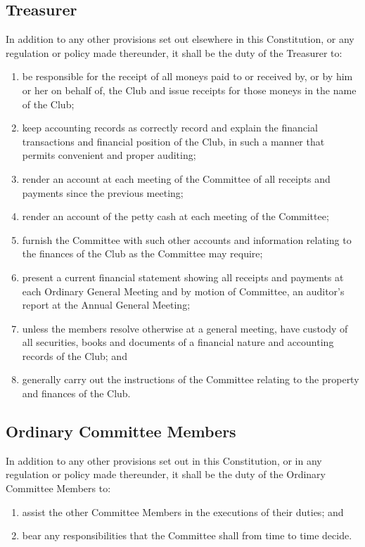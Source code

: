 \documentclass[11pt]{article} %
\begin{document}
\subsection{Treasurer}
In addition to any other provisions set out elsewhere in this Constitution, or any regulation or policy made thereunder, it shall be the duty of the Treasurer to:
\begin{enumerate}
	\item be responsible for the receipt of all moneys paid to or received by, or by him or her on behalf of, the Club and issue receipts for those moneys in the name of the Club;
	\item keep accounting records as correctly record and explain the financial transactions and financial position of the Club, in such a manner that permits convenient and proper auditing;
	\item render an account at each meeting of the Committee of all receipts and payments since the previous meeting;
	\item render an account of the petty cash at each meeting of the Committee;
	\item furnish the Committee with such other accounts and information relating to the finances of the Club as the Committee may require;
	\item present a current financial statement showing all receipts and payments at each Ordinary General Meeting and by motion of Committee, an auditor's report at the Annual General Meeting;
	\item unless the members resolve otherwise at a general meeting, have custody of all securities, books and documents of a financial nature and accounting records of the Club; and
	\item generally carry out the instructions of the Committee relating to the property and finances of the Club.
\end{enumerate}

\subsection{Ordinary Committee Members}
In addition to any other provisions set out in this Constitution, or in any regulation or policy made thereunder, it shall be the duty of the Ordinary Committee Members to:
\begin{enumerate}
	\item assist the other Committee Members in the executions of their duties; and 
	\item bear any responsibilities that the Committee shall from time to time decide.
\end{enumerate}
\end{document}
